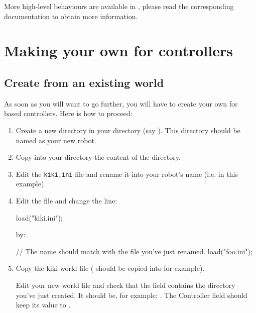 More high-level behaviours are available in , please read
the corresponding documentation to obtain more information.


\section{Making your own \urbi for \webots controllers}

\subsection{Create from an existing world}

As soon as you will want to go further, you will have to create your
own \urbi for \webots based controllers. Here is how to proceed:

\begin{enumerate}

\item Create a new directory in your  directory (say
  ). This directory should be named as your new robot.

\item Copy into your  directory the content of the
   directory.

\item Edit the \nolinkurl{kiki.ini} file and rename it into your
  robot's name (i.e.  in this example).

\item Edit the  file and change the line:

\begin{urbiunchecked}
load("kiki.ini");
\end{urbiunchecked}

by:

\begin{urbiunchecked}
// The name should match with the file you've just renamed.
load("foo.ini");
\end{urbiunchecked}

\item Copy the kiki world file ( should be
  copied into  for example).

  Edit your new world file and check that the field
   contains the directory you've just created. It
  should be, for example: .  The Controller field should
  keep its value to .
\end{enumerate}

